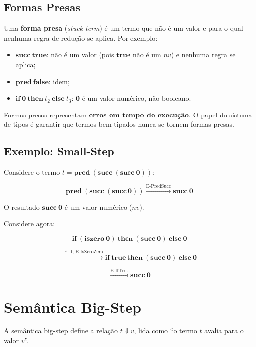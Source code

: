 \subsection{Formas Presas}

Uma \textbf{forma presa} (\emph{stuck term}) é um termo que não é um
valor e para o qual nenhuma regra de redução se aplica. Por exemplo:

\begin{itemize}
  \item \(\mathbf{succ}\ \mathbf{true}\): não é um valor (pois
    \(\mathbf{true}\) não é um \(nv\)) e nenhuma regra se aplica;
  \item \(\mathbf{pred}\ \mathbf{false}\): idem;
  \item \(\mathbf{if}\ \mathbf{0}\ \mathbf{then}\ t_2\ \mathbf{else}\ t_3\):
    \(\mathbf{0}\) é um valor numérico, não booleano.
\end{itemize}

Formas presas representam \textbf{erros em tempo de execução}. O
papel do sistema de tipos é garantir que termos bem tipados nunca se
tornem formas presas.

\subsection{Exemplo: Small-Step}

Considere o termo \(t =
\mathbf{pred}\ (\mathbf{succ}\ (\mathbf{succ}\ \mathbf{0}))\):

\[
  \mathbf{pred}\ (\mathbf{succ}\ (\mathbf{succ}\ \mathbf{0}))
  \xrightarrow{\text{E-PredSucc}}
  \mathbf{succ}\ \mathbf{0}
\]

O resultado \(\mathbf{succ}\ \mathbf{0}\) é um valor numérico (\(nv\)).

Considere agora:

\[
  \mathbf{if}\ (\mathbf{iszero}\ \mathbf{0})\ \mathbf{then}\ (\mathbf{succ}\ \mathbf{0})\ \mathbf{else}\ \mathbf{0}
\]

\[
  \xrightarrow{\text{E-If, E-IsZeroZero}}
  \mathbf{if}\ \mathbf{true}\ \mathbf{then}\ (\mathbf{succ}\ \mathbf{0})\ \mathbf{else}\ \mathbf{0}
\]

\[
  \xrightarrow{\text{E-IfTrue}}
  \mathbf{succ}\ \mathbf{0}
\]

\section{Semântica Big-Step}

A semântica big-step define a relação \(t \Downarrow v\), lida como
``o termo \(t\) avalia para o valor \(v\)''.

